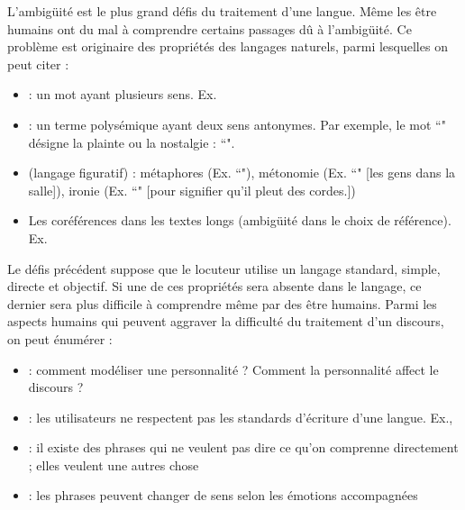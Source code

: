 \documentclass{KodeBook}
\begin{document}
L'ambigüité est le plus grand défis du traitement d'une langue. 
Même les être humains ont du mal à comprendre certains passages dû à l'ambigüité.
Ce problème est originaire des propriétés des langages naturels, parmi lesquelles on peut citer :
\begin{itemize}
	\item {} : un mot ayant plusieurs sens. Ex. 
	\item {} : un terme polysémique ayant deux sens antonymes. Par exemple, le mot ``" désigne la plainte ou la nostalgie : ``".
	\item {} (langage figuratif) : métaphores (Ex. ``"), métonomie (Ex. ``" [les gens dans la salle]), ironie (Ex. ``" [pour signifier qu'il pleut des cordes.])
	\item Les coréférences dans les textes longs (ambigüité dans le choix de référence). 
	Ex. 
\end{itemize}

Le défis précédent suppose que le locuteur utilise un langage standard, simple, directe et objectif.
Si une de ces propriétés sera absente dans le langage, ce dernier sera plus difficile à comprendre même par des être humains.
Parmi les aspects humains qui peuvent aggraver la difficulté du traitement d'un discours, on peut énumérer :
\begin{itemize}
	\item {} : comment modéliser une personnalité ? Comment la personnalité affect le discours ?
	\item {} : les utilisateurs ne respectent pas les standards d'écriture d'une langue. Ex., 
	\item {} : il existe des phrases qui ne veulent pas dire ce qu'on comprenne directement ; elles veulent une autres chose
	\item {} : les phrases peuvent changer de sens selon les émotions accompagnées
\end{itemize}
\end{document}
